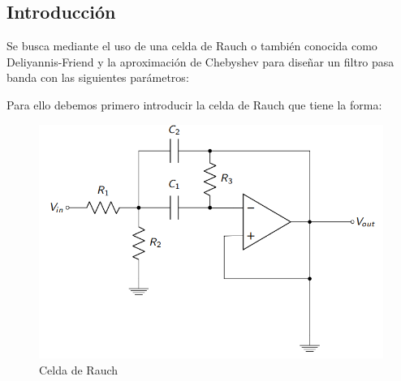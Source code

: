 \subsection{Introducción}

Se busca mediante el uso de una celda de Rauch o también conocida como Deliyannis-Friend y la aproximación de Chebyshev para diseñar un filtro pasa banda con las siguientes parámetros:

\begin{table}[H]
    \centering
    \caption{Par\'ametros de diseño para el filtro a implementar}
    \label{ej22diseno}
\end{table}

Para ello debemos primero introducir la celda de Rauch que tiene la forma:

\begin{figure}[H]
    \centering
    \includegraphics[scale = 0.6]{../Ejercicio2-DisenoDeCeldas/2CELDARAUCH/Informe/circuito3.png}
    \caption{Celda de Rauch}
    \label{ej22cirbasic}
\end{figure}

